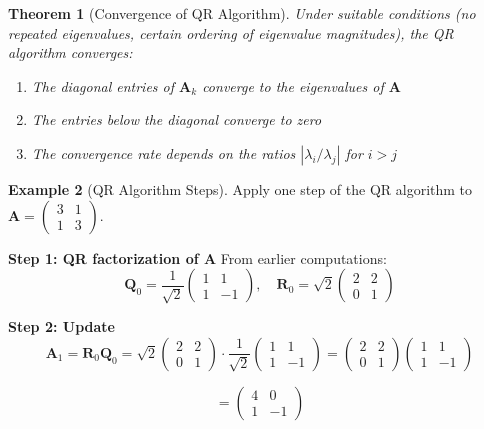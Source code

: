 \documentclass[12pt]{article}
\numberwithin{equation}{section}
\newcommand{\mat}[1]{\mathbf{#1}}        %
\theoremstyle{plain}
\newtheorem{theorem}{Theorem}[section]
\theoremstyle{definition}
\newtheorem{example}[theorem]{Example}
\theoremstyle{remark}
\begin{document}
\begin{theorem}[Convergence of QR Algorithm]
Under suitable conditions (no repeated eigenvalues, certain ordering of eigenvalue magnitudes), the QR algorithm converges:
\begin{enumerate}
\item The diagonal entries of $\mat{A}_k$ converge to the eigenvalues of $\mat{A}$
\item The entries below the diagonal converge to zero
\item The convergence rate depends on the ratios $|\lambda_i/\lambda_j|$ for $i > j$
\end{enumerate}
\end{theorem}

\begin{example}[QR Algorithm Steps]
Apply one step of the QR algorithm to $\mat{A} = \begin{pmatrix} 3 & 1 \\ 1 & 3 \end{pmatrix}$.

\textbf{Step 1: QR factorization of A}
From earlier computations:
$$\mat{Q}_0 = \frac{1}{\sqrt{2}}\begin{pmatrix} 1 & 1 \\ 1 & -1 \end{pmatrix}, \quad \mat{R}_0 = \sqrt{2}\begin{pmatrix} 2 & 2 \\ 0 & 1 \end{pmatrix}$$

\textbf{Step 2: Update}
$$\mat{A}_1 = \mat{R}_0\mat{Q}_0 = \sqrt{2}\begin{pmatrix} 2 & 2 \\ 0 & 1 \end{pmatrix} \cdot \frac{1}{\sqrt{2}}\begin{pmatrix} 1 & 1 \\ 1 & -1 \end{pmatrix} = \begin{pmatrix} 2 & 2 \\ 0 & 1 \end{pmatrix}\begin{pmatrix} 1 & 1 \\ 1 & -1 \end{pmatrix}$$

$$= \begin{pmatrix} 4 & 0 \\ 1 & -1 \end{pmatrix}$$


\end{example}
\end{document}
